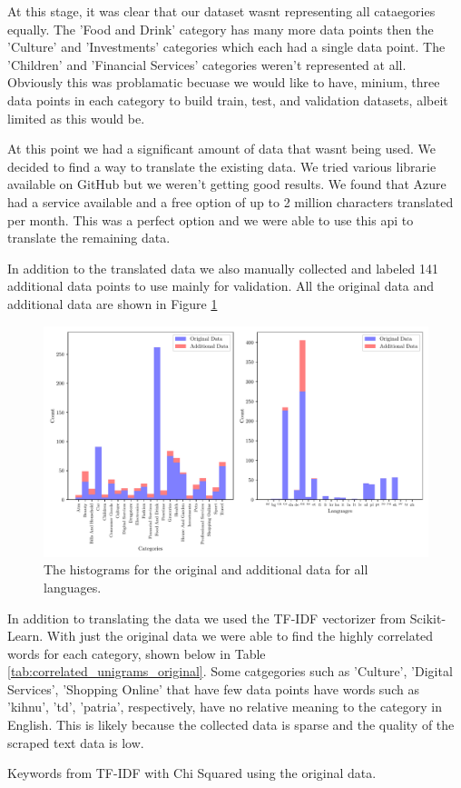 At this stage, it was clear that our dataset wasnt representing all cataegories equally. The 'Food and Drink' category has many more data points then the 'Culture' and 'Investments' categories which each had a single data point. The 'Children' and 'Financial Services' categories weren't represented at all. Obviously this was problamatic becuase we would like to have, minium, three data points in each category to build train, test, and validation datasets, albeit limited as this would be.

At this point we had a significant amount of data that wasnt being used. We decided to find a way to translate the existing data. We tried various librarie available on GitHub but we weren't getting good results. We found that Azure had a service available and a free option of up to 2 million characters translated per month. This was a perfect option and we were able to use this api to translate the remaining data.

In addition to the translated data we also manually collected and labeled 141 additional data points to use mainly for validation. All the original data and additional data are shown in Figure \ref{fig:all_hist}

\begin{figure}[!ht]
  \centering
  \includegraphics[width=\textwidth]{../img/plot_all_hist.pdf}
  \caption{The histograms for the original and additional data for all languages.}
  \label{fig:all_hist}
\end{figure}


In addition to translating the data we used the TF-IDF vectorizer from Scikit-Learn. With just the original data we were able to find the highly correlated words for each category, shown below in Table \ref{tab:correlated_unigrams_original}. Some catgegories such as 'Culture', 'Digital Services', 'Shopping Online' that have few data points have words such as 'kihnu', 'td', 'patria', respectively, have no relative meaning to the category in English. This is likely because the collected data is sparse and the quality of the scraped text data is low.



\begin{table}[!ht]
\centering
\caption{Keywords from TF-IDF with Chi Squared using the original data.}

\label{tab:correlated_unigrams_original}
\end{table}










